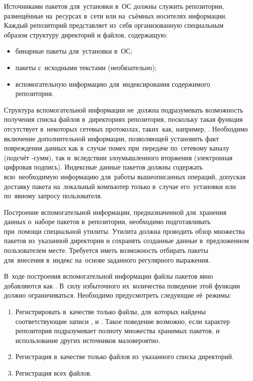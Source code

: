 Источниками пакетов для~установки в~ОС должны служить репозитории,
размещённые на~ресурсах в~сети или на~съёмных носителях информации.
Каждый репозиторий представляет из~себя организованную специальным образом структуру директорий и файлов, содержащую:

\begin{itemize}
\item{бинарные пакеты для~установки в~ОС;}
\item{пакеты с~исходными текстами (необязательно);}
\item{вспомогательную информацию для~индексирования содержимого репозитория.}
\end{itemize}

Структура вспомогательной информации не~должна подразумевать возможность получения списка файлов в~директориях репозитория,
поскольку такая функция отсутствует в~некоторых сетевых протоколах, таких~как, например, .
Необходимо включение дополнительной информации, позволяющей установить факт повреждения данных как в~случае 
помех при~передаче по~сетевому каналу (подсчёт -сумм), 
так и~вследствии злоумышленного вторжения (электронная цифровая подпись).
Индексные данные пакетов должны содержать всю~необходимую информацию для~работы вышеописанных операций,
допуская доставку пакета на~локальный компьютер только в~случае его~установки или по~явному запросу пользователя.

Построение вспомогательной информации, предназначенной для~хранения данных о~наборе пакетов в~репозитории,
необходимо подготавливать при~помощи специальной утилиты.
Утилита должна проводить обзор множества пакетов из~указанной директории и сохранять созданные данные в~предложенном пользователем месте.
Требуется иметь возможность отбирать пакеты для~внесения в~индекс на~основе заданного регулярного выражения.

В~ходе построения вспомогательной информации файлы пакетов явно добавляются как .
В~силу избыточного их~количества поведение этой функции должно ограничиваться.
Необходимо предусмотреть следующие её~режимы:

\begin{enumerate}

\item {
Регистрировать в~качестве  только файлы,
для~которых найдены соответствующие записи ,  и .
Такое поведение возможно, если характер репозитория подразумевает полноту множества хранимых пакетов,
 и использование других источников маловероятно.
}

\item {
Регистрация в~качестве  только файлов из~указанного списка директорий.
}

\item {
Регистрация всех файлов.
}

\end{enumerate}

